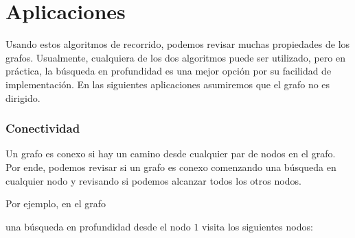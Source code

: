 \section{Aplicaciones}

Usando estos algoritmos de recorrido, podemos
revisar muchas propiedades de los grafos. Usualmente, cualquiera
de los dos algoritmos puede ser utilizado, pero en práctica, la
búsqueda en profundidad es una mejor opción por su facilidad de
implementación. En las siguientes aplicaciones asumiremos que el
grafo no es dirigido.

\subsubsection{Conectividad}


Un grafo es conexo si hay un camino desde cualquier
par de nodos en el grafo. Por ende, podemos revisar si un grafo
es conexo comenzando una búsqueda en cualquier nodo y revisando
si podemos alcanzar todos los otros nodos.

Por ejemplo, en el grafo
\begin{center}
\end{center}
una búsqueda en profundidad desde el nodo $1$ visita
los siguientes nodos:
\begin{center}
\end{center}

